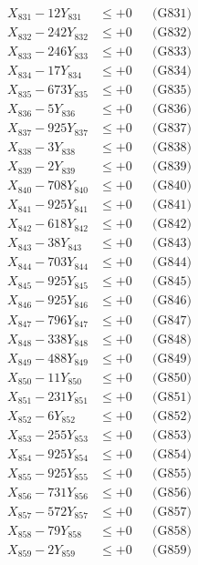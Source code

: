 \documentclass[a4paper,10pt]{article}
\begin{document}
{\begin{align}
\allowbreak
X_{831} - 12Y_{831} &\leq +0 && \text{(G831)} \\
X_{832} - 242Y_{832} &\leq +0 && \text{(G832)} \\
X_{833} - 246Y_{833} &\leq +0 && \text{(G833)} \\
X_{834} - 17Y_{834} &\leq +0 && \text{(G834)} \\
X_{835} - 673Y_{835} &\leq +0 && \text{(G835)} \\
X_{836} - 5Y_{836} &\leq +0 && \text{(G836)} \\
X_{837} - 925Y_{837} &\leq +0 && \text{(G837)} \\
X_{838} - 3Y_{838} &\leq +0 && \text{(G838)} \\
X_{839} - 2Y_{839} &\leq +0 && \text{(G839)} \\
X_{840} - 708Y_{840} &\leq +0 && \text{(G840)} \\
\allowbreak
X_{841} - 925Y_{841} &\leq +0 && \text{(G841)} \\
X_{842} - 618Y_{842} &\leq +0 && \text{(G842)} \\
X_{843} - 38Y_{843} &\leq +0 && \text{(G843)} \\
X_{844} - 703Y_{844} &\leq +0 && \text{(G844)} \\
X_{845} - 925Y_{845} &\leq +0 && \text{(G845)} \\
X_{846} - 925Y_{846} &\leq +0 && \text{(G846)} \\
X_{847} - 796Y_{847} &\leq +0 && \text{(G847)} \\
X_{848} - 338Y_{848} &\leq +0 && \text{(G848)} \\
X_{849} - 488Y_{849} &\leq +0 && \text{(G849)} \\
X_{850} - 11Y_{850} &\leq +0 && \text{(G850)} \\
\allowbreak
X_{851} - 231Y_{851} &\leq +0 && \text{(G851)} \\
X_{852} - 6Y_{852} &\leq +0 && \text{(G852)} \\
X_{853} - 255Y_{853} &\leq +0 && \text{(G853)} \\
X_{854} - 925Y_{854} &\leq +0 && \text{(G854)} \\
X_{855} - 925Y_{855} &\leq +0 && \text{(G855)} \\
X_{856} - 731Y_{856} &\leq +0 && \text{(G856)} \\
X_{857} - 572Y_{857} &\leq +0 && \text{(G857)} \\
X_{858} - 79Y_{858} &\leq +0 && \text{(G858)} \\
X_{859} - 2Y_{859} &\leq +0 && \text{(G859)} \\

\end{align}}
\end{document}
